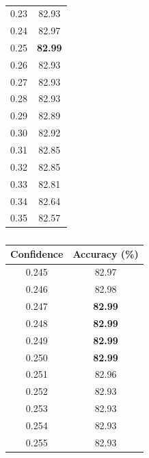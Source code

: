 \documentclass[12pt]{article}
\begin{document}
\begin{table}[H]
\begin{subtable}{.34\linewidth}
\begin{tabular}{c|c}
              0.23  & 82.93 \\
              0.24  & 82.97 \\
              0.25  & \textbf{82.99} \\
              0.26  & 82.93 \\
              0.27  & 82.93 \\
              0.28  & 82.93 \\
              0.29  & 82.89 \\
              0.30  & 82.92 \\
              0.31  & 82.85 \\
              0.32  & 82.85 \\
              0.33  & 82.81 \\
              0.34  & 82.64 \\
              0.35  & 82.57 \\
              \bottomrule
            \end{tabular}
            \label{tab:dt-con-b}
          \end{subtable}%
          \begin{subtable}{.34\linewidth}
            \centering
            \caption{}
            \begin{tabular}{c|c}
              \toprule
              \multicolumn{1}{l|}{Confidence} & \multicolumn{1}{l}{Accuracy (\%)} \\
              \midrule
              0.245 & 82.97 \\
              0.246 & 82.98 \\
              0.247 & \textbf{82.99} \\
              0.248 & \textbf{82.99} \\
              0.249 & \textbf{82.99} \\
              0.250 & \textbf{82.99} \\
              0.251 & 82.96 \\
              0.252 & 82.93 \\
              0.253 & 82.93 \\
              0.254 & 82.93 \\
              0.255 & 82.93 \\
              \bottomrule
            \end{tabular}
          \label{tab:dt-con-c}
          \end{subtable}%
        \label{tab:dt-con}
      \end{table}
\end{document}
